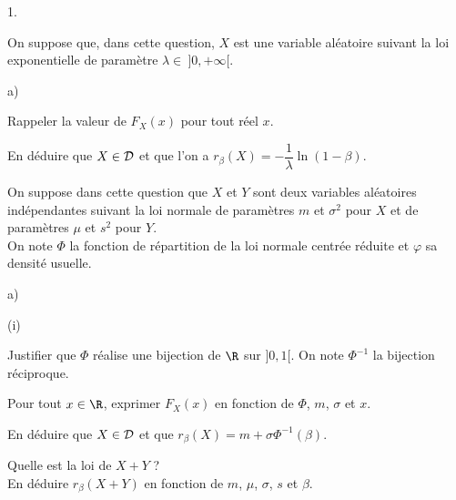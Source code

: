 \begin{noliste}{1.}
  \setlength{\itemsep}{4mm}
  \setcounter{enumi}{1}
  \item On suppose que, dans cette question, $X$ est une variable 
  aléatoire suivant la loi exponentielle de paramètre $\lambda \in 
  \ ]0,+\infty[$.
  \begin{noliste}{a)}
    \setlength{\itemsep}{2mm}
    \item Rappeler la valeur de $F_X(x)$ pour tout réel $x$.
    
    

    
    \item En déduire que $X \in {\cal D}$ et que l'on a 
    $r_\beta(X)=-\dfrac1\lambda \ln(1-\beta)$.
    
    

  \end{noliste}

  \item On suppose dans cette question que $X$ et $Y$ sont deux 
  variables aléatoires indépendantes suivant la loi normale de 
  paramètres $m$ et $\sigma^2$ pour $X$ et de paramètres $\mu$ et 
  $s^2$ pour $Y$.\\
  On note $\Phi$ la fonction de répartition de la loi normale 
  centrée réduite et $\varphi$ sa densité usuelle.
  \begin{noliste}{a)}
    \setlength{\itemsep}{2mm}
    \item 
    \begin{nonoliste}{(i)}
      \item Justifier que $\Phi$ réalise une bijection de $\R$ sur 
      $]0,1[$. On note $\Phi^{-1}$ la bijection réciproque.
      
      
      
      
      
      

      
      \item Pour tout $x \in\R$, exprimer $F_X(x)$ en fonction de 
      $\Phi$, $m$, $\sigma$ et $x$.
      
      

      
      \item En déduire que $X \in {\cal D}$ et que 
      $r_\beta(X)=m+\sigma \Phi^{-1}(\beta)$.
      
      
    \end{nonoliste}
    
    \item Quelle est la loi de $X+Y$ ?\\
    En déduire $r_\beta(X+Y)$ en fonction de $m$, $\mu$, $\sigma$, 
    $s$ et $\beta$.
    

\end{noliste}
\end{noliste}
